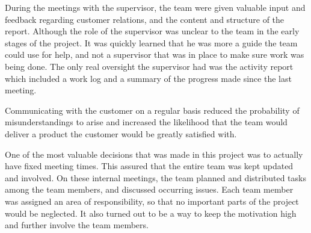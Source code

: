 During the meetings with the supervisor, the team were given valuable input and feedback regarding customer relations, and the content and structure of the report. Although the role of the supervisor was unclear to the team in the early stages of the project. It was quickly learned that he was more a guide the team could use for help, and not a supervisor that was in place to make sure work was being done. The only real oversight the supervisor had was the activity report which included a work log and a summary of the progress made since the last meeting.

Communicating with the customer on a regular basis reduced the probability of misunderstandings to arise and increased the likelihood that the team would deliver a product the customer would be greatly satisfied with. 

One of the most valuable decisions that was made in this project was to actually have fixed meeting times. This assured that the entire team was kept updated and involved. On these internal meetings, the team planned and distributed tasks among the team members, and discussed occurring issues. Each team member was assigned an area of responsibility, so that no important parts of the project would be neglected. It also turned out to be a way to keep the motivation high and further involve the team members.
